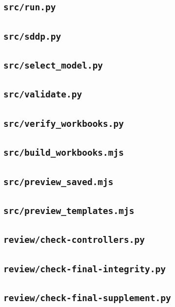 \subsection{\texttt{src/run.py}}
\subsection{\texttt{src/sddp.py}}
\subsection{\texttt{src/select\_model.py}}
\subsection{\texttt{src/validate.py}}
\subsection{\texttt{src/verify\_workbooks.py}}
\subsection{\texttt{src/build\_workbooks.mjs}}
\subsection{\texttt{src/preview\_saved.mjs}}
\subsection{\texttt{src/preview\_templates.mjs}}
\subsection{\texttt{review/check-controllers.py}}
\subsection{\texttt{review/check-final-integrity.py}}
\subsection{\texttt{review/check-final-supplement.py}}
